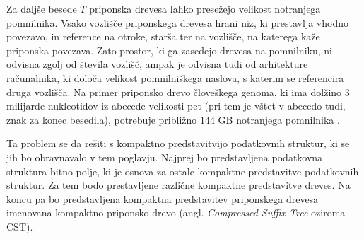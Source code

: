 Za daljše besede $T$ priponska drevesa lahko presežejo velikost notranjega pomnilnika. Vsako vozlišče priponskega drevesa hrani niz, ki prestavlja vhodno povezavo, in reference na otroke, starša ter na vozlišče, na katerega kaže priponska povezava. Zato prostor, ki ga zasedejo drevesa na pomnilniku, ni odvisna zgolj od števila vozlišč, ampak je odvisna tudi od arhitekture računalnika, ki določa velikost pomnilniškega naslova, s katerim se referencira druga vozlišča. Na primer priponsko drevo človeškega genoma, ki ima dolžino 3 milijarde nukleotidov iz abecede velikosti pet (pri tem je vštet v abecedo tudi, znak za konec besedila), potrebuje približno $144$ GB notranjega pomnilnika \cite{GENOMEKNOWLEDGEHUB-2024-10-30}.

Ta problem se da rešiti s kompaktno predstavitvijo podatkovnih struktur, ki se jih bo obravnavalo v tem poglavju. Najprej bo predstavljena podatkovna struktura bitno polje, ki je osnova za ostale kompaktne predstavitve podatkovnih struktur. Za tem bodo prestavljene različne kompaktne predstavitve dreves. Na koncu pa bo predstavljena kompaktna predstavitev priponskega drevesa imenovana kompaktno priponsko drevo (angl. \textit{Compressed Suffix Tree} oziroma CST).


